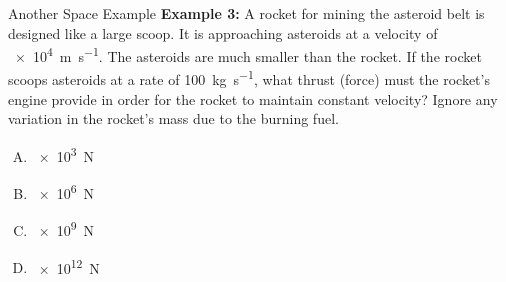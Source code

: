 \documentclass[12pt,compress,aspectratio=169]{beamer}
\begin{document}



\begin{frame}{Another Space Example}
  \textbf{Example 3:} A rocket for mining the asteroid belt is designed like a
  large scoop. It is approaching asteroids at a velocity of
  \SI{e4}{\metre\per\second}. The asteroids are much smaller than the rocket.
  If the rocket scoops asteroids at a rate of \SI{100}{\kilo\gram\per\second},
  what thrust (force) must the rocket's engine provide in order for the rocket
  to maintain constant velocity? Ignore any variation in the rocket's mass due
  to the burning fuel.

  \vspace{.15in}\begin{enumerate}[A.]
  \item\SI{e3}\newton
  \item\SI{e6}\newton
  \item\SI{e9}\newton
  \item\SI{e12}\newton
  \end{enumerate}
\end{frame}


\end{document}
